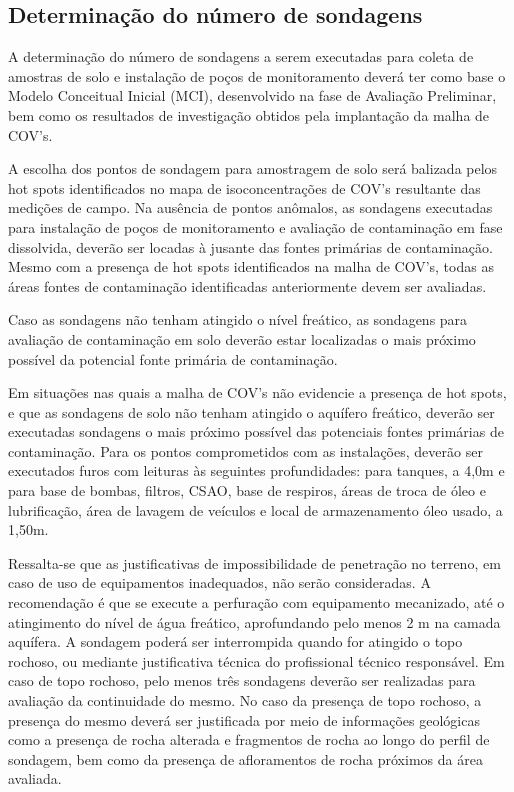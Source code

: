 \subsection{Determinação do número de sondagens}

A determinação do número de sondagens a serem executadas 
para coleta de amostras de solo e instalação de poços de 
monitoramento deverá ter como base o Modelo Conceitual 
Inicial (MCI), desenvolvido na fase de Avaliação 
Preliminar, bem como os resultados de investigação obtidos 
pela implantação da malha de COV’s.

A escolha dos pontos de sondagem para amostragem de solo 
será balizada pelos hot spots identificados no mapa de 
isoconcentrações de COV’s resultante das medições de campo. 
Na ausência de pontos anômalos, as sondagens executadas 
para instalação de poços de monitoramento e avaliação de 
contaminação em fase dissolvida, deverão ser locadas à 
jusante das fontes primárias de contaminação. Mesmo com a 
presença de hot spots identificados na malha de COV's, 
todas as áreas fontes de contaminação identificadas 
anteriormente devem ser avaliadas.

Caso as sondagens não tenham atingido o nível freático, as 
sondagens para avaliação de contaminação em solo deverão 
estar localizadas o mais próximo possível da potencial 
fonte primária de contaminação.

Em situações nas quais a malha de COV’s não evidencie a 
presença de hot spots, e que as sondagens de solo não 
tenham atingido o aquífero freático, deverão ser executadas 
sondagens o mais próximo possível das potenciais fontes 
primárias de contaminação. Para os pontos comprometidos com 
as instalações, deverão ser executados furos com leituras 
às seguintes profundidades: para tanques, a 4,0m e para 
base de bombas, filtros, CSAO, base de respiros, áreas de 
troca de óleo e lubrificação, área de lavagem de veículos e 
local de armazenamento óleo usado, a 1,50m.

Ressalta-se que as justificativas de impossibilidade de 
penetração no terreno, em caso de uso de equipamentos 
inadequados, não serão consideradas. A recomendação é que 
se execute a perfuração com equipamento mecanizado, até o 
atingimento do nível de água freático, aprofundando pelo 
menos 2 m na camada aquífera. A sondagem poderá ser 
interrompida quando for atingido o topo rochoso, ou 
mediante justificativa técnica do profissional técnico 
responsável. Em caso de topo rochoso, pelo menos três 
sondagens deverão ser realizadas para avaliação da 
continuidade do mesmo. No caso da presença de topo rochoso, 
a presença do mesmo deverá ser justificada por meio de 
informações geológicas como a presença de rocha alterada e 
fragmentos de rocha ao longo do perfil de sondagem, bem 
como da presença de afloramentos de rocha próximos da área 
avaliada.

